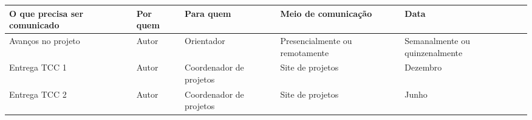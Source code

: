 \begin{table}[h!]
    \begin{tabularx}{\textwidth}{|X|X|X|X|X|}
        \hline
        \textbf{O que precisa ser comunicado}   & \textbf{Por quem} & \textbf{Para quem}    & \textbf{Meio de comunicação}  & \textbf{Data} \\
        \hline
        Avanços no projeto & Autor & Orientador & Presencialmente ou remotamente & Semanalmente ou quinzenalmente \\
        \hline
        Entrega TCC 1 & Autor & Coordenador de projetos & Site de projetos & Dezembro \\
        \hline
        Entrega TCC 2 & Autor & Coordenador de projetos & Site de projetos & Junho \\
        \hline
    \end{tabularx}
    \label{tab:comunication}
\end{table}
